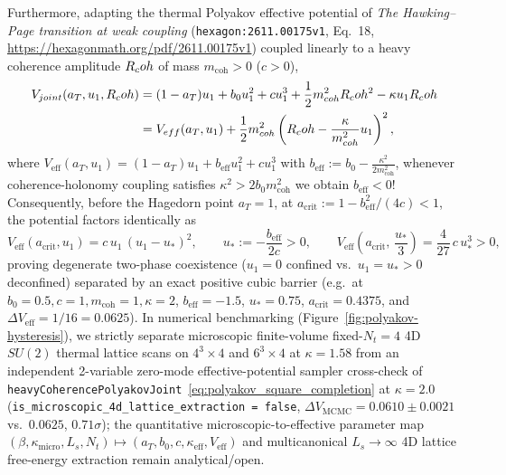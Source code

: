Furthermore, adapting the thermal Polyakov effective potential of \emph{The Hawking--Page transition at weak coupling} (\texttt{hexagon:2611.00175v1}, Eq.~18, \url{https://hexagonmath.org/pdf/2611.00175v1}) coupled linearly to a heavy coherence amplitude $R_coh$ of mass $m_{\mathrm{coh}} > 0$ ($c > 0$),
\begin{align}
V_{joint}(a_T, u_1, R_coh)
&= (1 - a_T)u_1 + b_0 u_1^2 + c u_1^3 + \frac{1}{2}m_{coh}^2R_coh^2 - \kappa u_1R_coh \nonumber\\
&= V_{eff}(a_T, u_1) + \frac{1}{2}m_{coh}^2\left(R_coh - \frac{\kappa}{m_{coh}^2}u_1\right)^2,
\label{eq:polyakov_square_completion}
\end{align}
where $V_{\mathrm{eff}}(a_T, u_1) = (1 - a_T)u_1 + b_{\mathrm{eff}} u_1^2 + c u_1^3$ with $b_{\mathrm{eff}} := b_0 - \frac{\kappa^2}{2 m_{\mathrm{coh}}^2}$, whenever coherence-holonomy coupling satisfies $\kappa^2 > 2 b_0 m_{\mathrm{coh}}^2$ we obtain $b_{\mathrm{eff}} < 0$! Consequently, before the Hagedorn point $a_T = 1$, at $a_{\mathrm{crit}} := 1 - b_{\mathrm{eff}}^2/(4c) < 1$, the potential factors identically as
\begin{equation}
V_{\mathrm{eff}}(a_{\mathrm{crit}}, u_1) = c\,u_1\,(u_1 - u_*)^2,
\qquad
u_* := -\frac{b_{\mathrm{eff}}}{2c} > 0,
\qquad
V_{\mathrm{eff}}\!\left(a_{\mathrm{crit}},\,\frac{u_*}{3}\right) = \frac{4}{27}\,c\,u_*^3 > 0,
\label{eq:polyakov_barrier_exact_sec53}
\end{equation}
proving degenerate two-phase coexistence ($u_1 = 0$ confined vs.\ $u_1 = u_* > 0$ deconfined) separated by an exact positive cubic barrier (e.g.\ at $b_0 = 0.5, c = 1, m_{\mathrm{coh}} = 1, \kappa = 2$, $b_{\mathrm{eff}} = -1.5$, $u_* = 0.75$, $a_{\mathrm{crit}} = 0.4375$, and $\Delta V_{\mathrm{eff}} = 1/16 = 0.0625$). In numerical benchmarking (Figure~\ref{fig:polyakov-hysteresis}), we strictly separate microscopic finite-volume fixed-$N_t = 4$ 4D $SU(2)$ thermal lattice scans on $4^3\times 4$ and $6^3\times 4$ at $\kappa = 1.58$ from an independent 2-variable zero-mode effective-potential sampler cross-check of \texttt{heavy\allowbreak{}Coherence\allowbreak{}Polyakov\allowbreak{}Joint}~\eqref{eq:polyakov_square_completion} at $\kappa = 2.0$ (\texttt{is\_\allowbreak{}microscopic\_\allowbreak{}4d\_\allowbreak{}lattice\_\allowbreak{}extraction = false}, $\Delta V_{\mathrm{MCMC}} = 0.0610 \pm 0.0021$ vs.\ $0.0625$, $0.71\sigma$); the quantitative microscopic-to-effective parameter map $(\beta, \kappa_{\mathrm{micro}}, L_s, N_t) \mapsto (a_T, b_0, c, \kappa_{\mathrm{eff}}, V_{\mathrm{eff}})$ and multicanonical $L_s \to \infty$ 4D lattice free-energy extraction remain analytical/open.

